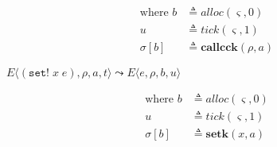 \documentclass[12pt,draft]{article}
\newcommand{\setsyn}[2]{(\texttt{set!}\;#1\;#2)}
\begin{document}
\begin{multicols*}{2}
\begin{align*}
\text{where } b &\triangleq alloc(\varsigma, 0) \\
u &\triangleq tick(\varsigma, 1) \\
\sigma[b] &\triangleq \textbf{callcck}(\rho, a)
\end{align*}
\begin{center}
  $E\langle \setsyn{x}{e} , \rho , a , t \rangle
  \leadsto E\langle e , \rho , b , u \rangle$
\end{center}
\vspace{-7mm}
\begin{align*}
\text{where } b &\triangleq alloc(\varsigma, 0) \\
u &\triangleq tick(\varsigma, 1) \\
\sigma[b] &\triangleq \textbf{setk}(x, a)
\end{align*}


\vfill\null
\columnbreak


\end{multicols*}
\end{document}
